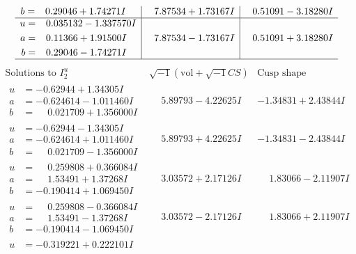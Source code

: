 \documentclass[1p]{elsarticle_modified}
\theoremstyle{definition}
\newcommand{\I}{\sqrt{-1}}
\begin{document}
$$\begin{array}{c|c|c}
\begin{aligned}
b &= \phantom{-}0.29046 + 1.74271 I\end{aligned}
 & \phantom{-}7.87534 + 1.73167 I & \phantom{-}0.51091 - 3.18280 I \\ \hline\begin{aligned}
u &= \phantom{-}0.035132 - 1.337570 I \\
a &= \phantom{-}0.11366 + 1.91500 I \\
b &= \phantom{-}0.29046 - 1.74271 I\end{aligned}
 & \phantom{-}7.87534 - 1.73167 I & \phantom{-}0.51091 + 3.18280 I\\
 \hline 
 \end{array}$$\newpage$$\begin{array}{c|c|c}  
\text{Solutions to }I^u_{2}& \I (\text{vol} + \sqrt{-1}CS) & \text{Cusp shape}\\
 \hline 
\begin{aligned}
u &= -0.62944 + 1.34305 I \\
a &= -0.624614 - 1.011460 I \\
b &= \phantom{-}0.021709 + 1.356000 I\end{aligned}
 & \phantom{-}5.89793 - 4.22625 I & -1.34831 + 2.43844 I \\ \hline\begin{aligned}
u &= -0.62944 - 1.34305 I \\
a &= -0.624614 + 1.011460 I \\
b &= \phantom{-}0.021709 - 1.356000 I\end{aligned}
 & \phantom{-}5.89793 + 4.22625 I & -1.34831 - 2.43844 I \\ \hline\begin{aligned}
u &= \phantom{-}0.259808 + 0.366084 I \\
a &= \phantom{-}1.53491 + 1.37268 I \\
b &= -0.190414 + 1.069450 I\end{aligned}
 & \phantom{-}3.03572 + 2.17126 I & \phantom{-}1.83066 - 2.11907 I \\ \hline\begin{aligned}
u &= \phantom{-}0.259808 - 0.366084 I \\
a &= \phantom{-}1.53491 - 1.37268 I \\
b &= -0.190414 - 1.069450 I\end{aligned}
 & \phantom{-}3.03572 - 2.17126 I & \phantom{-}1.83066 + 2.11907 I \\ \hline\begin{aligned}
u &= -0.319221 + 0.222101 I \\

\end{aligned}
\end{array}$$
\end{document}

